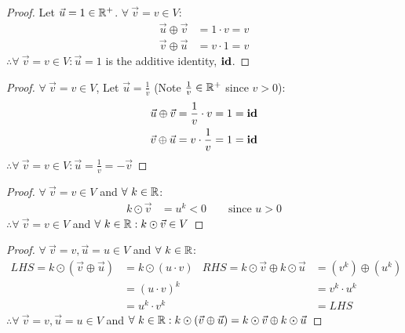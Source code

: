 \documentclass{article}
\begin{document}
\begin{enumerate}
    \begin{proof}
        Let $\vec{u} = 1 \in \mathbb{R}^+$. $\forall~\vec{v} = v \in V$:
        \begin{align*}
            \vec{u} \oplus \vec{v} & = 1 \cdot v = v \\
            \vec{v} \oplus \vec{u} & = v \cdot 1 = v
        \end{align*}
        $\therefore \forall~\vec{v} = v \in V: \vec{u} = 1$ is the additive identity, $\operatorname{\textbf{id}}$.
    \end{proof}
    \begin{proof}
        $\forall~\vec{v} = v \in V$, Let $\vec{u} = \frac{1}{v}$ (Note $\frac{1}{v} \in \mathbb{R}^+$ since $v > 0$):
        \begin{align*}
            \vec{u} \oplus \vec{v} & = \frac{1}{v} \cdot v = 1 = \operatorname{\textbf{id}} \\
            \vec{v} \oplus \vec{u} & = v \cdot \frac{1}{v} = 1 = \operatorname{\textbf{id}}
        \end{align*}
        $\therefore \forall~\vec{v} = v \in V: \vec{u} = \frac{1}{v} = -\vec{v}$
    \end{proof}
    \begin{proof}
        $\forall~\vec{v} = v \in V$ and $\forall~k \in \mathbb{R}$:
        \begin{align*}
            k \odot \vec{v} & = u^k < 0 \qquad \text{since $u>0$}
        \end{align*}
        $\therefore \forall~\vec{v} = v \in V$ and $\forall~k \in \mathbb{R}: k \odot \vec{v} \in V$
    \end{proof}
    \begin{proof}
        $\forall~\vec{v} = v,\vec{u} = u \in V$ and $\forall~k \in \mathbb{R}$:
        \begin{align*}
            LHS = k \odot (\vec{v} \oplus \vec{u}) & = k \odot (u \cdot v) & RHS = k \odot \vec{v} \oplus k \odot \vec{u} & = (v^k) \oplus (u^k) \\
                                                   & = (u \cdot v)^k       &                                              & = v^k \cdot u^k      \\
                                                   & = u^k \cdot v^k       &                                              & = LHS
        \end{align*}
        $\therefore \forall~\vec{v} = v,\vec{u} = u \in V$ and $\forall~k \in \mathbb{R}: k \odot (\vec{v} \oplus \vec{u}) = k \odot \vec{v} \oplus k \odot \vec{u}$

\end{proof}
\end{enumerate}
\end{document}
